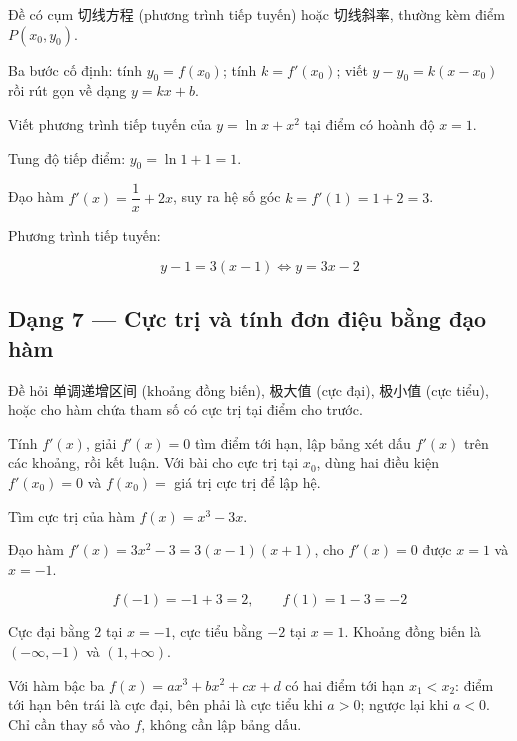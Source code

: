 \documentclass[11pt, a4paper]{article}
\begin{document}
 Đề có cụm 切线方程 (phương trình tiếp tuyến) hoặc 切线斜率, thường kèm điểm $P(x_0, y_0)$.

 Ba bước cố định: tính $y_0 = f(x_0)$; tính $k = f'(x_0)$; viết $y - y_0 = k(x - x_0)$ rồi rút gọn về dạng $y = kx + b$.

\begin{vidu}[{6}]
Viết phương trình tiếp tuyến của $y = \ln x + x^2$ tại điểm có hoành độ $x = 1$.

Tung độ tiếp điểm: $y_0 = \ln 1 + 1 = 1$.

Đạo hàm $f'(x) = \dfrac{1}{x} + 2x$, suy ra hệ số góc $k = f'(1) = 1 + 2 = 3$.

Phương trình tiếp tuyến:

$$y - 1 = 3(x - 1) \iff y = 3x - 2$$

\end{vidu}
\subsection{Dạng 7 — Cực trị và tính đơn điệu bằng đạo hàm}

 Đề hỏi 单调递增区间 (khoảng đồng biến), 极大值 (cực đại), 极小值 (cực tiểu), hoặc cho hàm chứa tham số có cực trị tại điểm cho trước.

 Tính $f'(x)$, giải $f'(x) = 0$ tìm điểm tới hạn, lập bảng xét dấu $f'(x)$ trên các khoảng, rồi kết luận. Với bài cho cực trị tại $x_0$, dùng hai điều kiện $f'(x_0) = 0$ và $f(x_0) = $ giá trị cực trị để lập hệ.

\begin{vidu}[{7}]
Tìm cực trị của hàm $f(x) = x^3 - 3x$.

Đạo hàm $f'(x) = 3x^2 - 3 = 3(x - 1)(x + 1)$, cho $f'(x) = 0$ được $x = 1$ và $x = -1$.


$$f(-1) = -1 + 3 = 2, \qquad f(1) = 1 - 3 = -2$$

Cực đại bằng $2$ tại $x = -1$, cực tiểu bằng $-2$ tại $x = 1$. Khoảng đồng biến là $(-\infty, -1)$ và $(1, +\infty)$.

 Với hàm bậc ba $f(x) = ax^3 + bx^2 + cx + d$ có hai điểm tới hạn $x_1 < x_2$: điểm tới hạn bên trái là cực đại, bên phải là cực tiểu khi $a > 0$; ngược lại khi $a < 0$. Chỉ cần thay số vào $f$, không cần lập bảng dấu.

\end{vidu}
\end{document}
